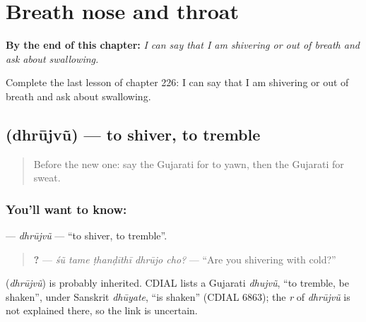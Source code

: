 
\chapter{Breath nose and throat}
\label{ch:gu-breath-nose-and-throat}

\begin{chapteropening}
\textbf{By the end of this chapter:} \emph{I can say that I am shivering or out of breath and ask about swallowing.}

Complete the last lesson of chapter 226: I can say that I am shivering or out of breath and ask about swallowing.
\end{chapteropening}

\section[\texorpdfstring{\gu{ધ્રૂજવું} (dhrūjvũ)}{ધ્રૂજવું (dhrūjvũ)}]{ (dhrūjvũ) — to shiver, to tremble}

\label{lesson:GU-C226-dhrujvu}



\begin{quote}
Before the new one: say the Gujarati for to yawn, then the Gujarati for sweat.
\end{quote}

\subsection*{You'll want to know: }
\textbf{} — \emph{dhrūjvũ} — \textquotedblleft{}to shiver, to tremble\textquotedblright{}.

\begin{quote}
\textbf{    ?} — \emph{śũ tame ṭhanḍīthī dhrūjo cho?} — \textquotedblleft{}Are you shivering with cold?\textquotedblright{}
\end{quote}

\begin{cousinweb}
\textbf{} (\emph{dhrūjvũ}) is probably inherited. CDIAL lists a Gujarati \emph{dhujvũ}, \textquotedblleft{}to tremble, be shaken\textquotedblright{}, under Sanskrit \emph{dhūyate}, \textquotedblleft{}is shaken\textquotedblright{} (CDIAL 6863); the \emph{r} of \emph{dhrūjvũ} is not explained there, so the link is uncertain.
\end{cousinweb}

